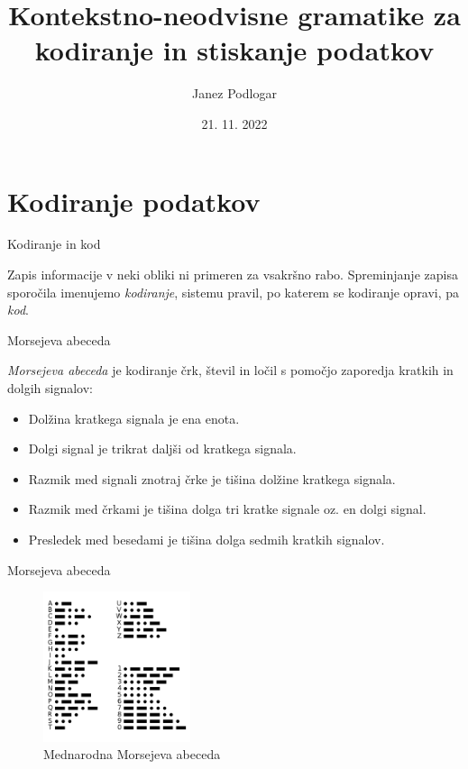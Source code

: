 \documentclass{beamer}
\title[Gramatike za kodiranje podatkov]{Kontekstno-neodvisne gramatike za kodiranje in stiskanje podatkov}
\author{Janez Podlogar}
\institute[UL-FMF]{Univerza v Ljubljani, Fakulteta za matematiko in fiziko}
\date[November 2022]{21. 11. 2022}
\theoremstyle{definition} %
\theoremstyle{plain} %
\begin{document}
\begin{frame}
    \titlepage
\end{frame}

\section{Kodiranje podatkov}

\begin{frame}{Kodiranje in kod}
    
    Zapis informacije v neki obliki ni primeren za vsakršno rabo. Spreminjanje zapisa sporočila
    imenujemo \textit{kodiranje}, sistemu pravil, po katerem se kodiranje opravi, pa \textit{kod}. 

\end{frame}

\begin{frame}{Morsejeva abeceda}

    \textit{Morsejeva abeceda} je kodiranje črk, števil in ločil s pomočjo zaporedja kratkih
    in dolgih signalov:

    \begin{itemize}
        \item Dolžina kratkega signala je ena enota.
        \item Dolgi signal je trikrat daljši od kratkega signala.
        \item Razmik med signali znotraj črke je tišina dolžine kratkega signala.
        \item Razmik med črkami je tišina dolga tri kratke signale oz. en dolgi signal.
        \item Presledek med besedami je tišina dolga sedmih kratkih signalov.
    \end{itemize}

\end{frame}

\begin{frame}{Morsejeva abeceda}

    \begin{figure}[h]
        \centering
        \includegraphics[width=4.3cm]{International_Morse_Code.svg.png}
        \caption{Mednarodna Morsejeva abeceda}
    \end{figure}
    
\end{frame}
\end{document}
